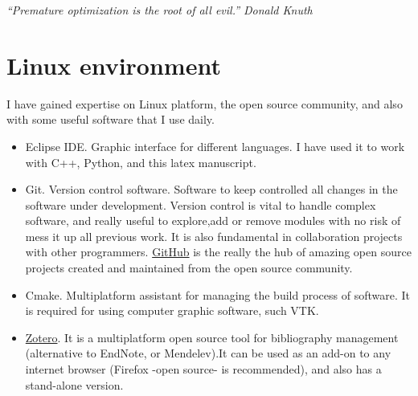 \emph{``Premature optimization is the root of all evil.'' Donald Knuth}
\section{Linux environment}

I have gained expertise on Linux
platform, the open source community, and also with some useful software that I
use daily.
 
 \begin{itemize}
   \item Eclipse IDE. Graphic interface for different languages. I have used
   it to work with C++, Python, and this latex manuscript.
   \item Git. Version control software. Software to keep controlled all
   changes in the software under development. Version control is vital to handle
   complex software, and really useful to explore,add or remove modules  with no
   risk of mess it up all previous work. It is also fundamental in collaboration
   projects with other programmers. \href{https://github.com/}{GitHub} is the really the hub
   of amazing open source projects created and maintained from the open source community.
   \item Cmake. Multiplatform assistant for managing the build process of
   software. It is required for using computer graphic software, such VTK.
   \item \href{http://www.zotero.org/}{Zotero}. It is a multiplatform open
   source tool for bibliography management (alternative to EndNote, or
   Mendelev).It can be used as an add-on to any internet browser (Firefox -open source- is recommended), and also has a 
   stand-alone version.
 

 \end{itemize}
 





